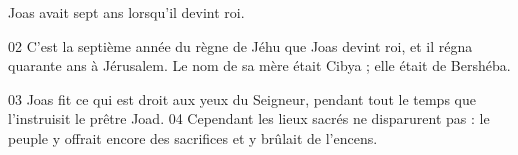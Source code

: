 Joas avait sept ans lorsqu’il devint roi.

02 C’est la septième année du règne de Jéhu que Joas devint roi, et il régna quarante ans à Jérusalem. Le nom de sa mère était Cibya ; elle était de Bershéba.

03 Joas fit ce qui est droit aux yeux du Seigneur, pendant tout le temps que l’instruisit le prêtre Joad.
04 Cependant les lieux sacrés ne disparurent pas : le peuple y offrait encore des sacrifices et y brûlait de l’encens.
